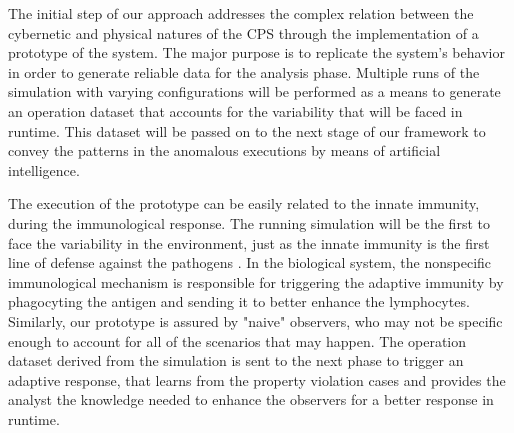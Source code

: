 

The initial step of our approach addresses the complex relation between the cybernetic and physical natures of the CPS through the implementation of a prototype of the system.  %
The major purpose is to replicate the system's behavior in order to generate reliable data for the analysis phase. Multiple runs of the simulation with varying configurations will be performed as a means to generate an operation dataset that accounts for the variability that will be faced in runtime. This dataset will be passed on to the next stage of our framework to convey the patterns in the anomalous executions by means of artificial intelligence.

The execution of the prototype can be easily related to the innate immunity, during the immunological response. The running simulation will be the first to face the variability in the environment, just as the innate immunity is the first line of defense against the pathogens \cite{Kuby2019}. In the biological system, the nonspecific immunological mechanism is responsible for triggering the adaptive immunity by phagocyting the antigen and sending it to better enhance the lymphocytes. Similarly, our prototype is assured by "naive" observers, who may not be specific enough to account for all of the scenarios that may happen. The operation dataset derived from the simulation is sent to the next phase to trigger an adaptive response, that learns from the property violation cases and provides the analyst the knowledge needed to enhance the observers for a better response in runtime.

